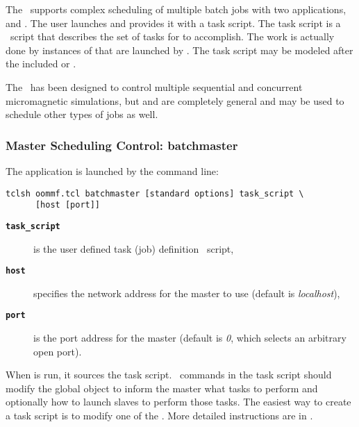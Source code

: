 The \OBS\ supports complex scheduling of multiple batch jobs
with two applications,  and .
The user launches  and provides it with
a task script.  The task script is a
\Tcl\ script that describes the set of tasks for 
to accomplish.  The work is actually done by instances of
 that are launched by .
The task script may be
modeled after the included {} or {}
.

The \OBS\ has been designed to control multiple sequential and
concurrent micromagnetic simulations, but
 and  are completely general
and may be used to schedule other types of jobs as well.

\subsubsection{Master Scheduling Control: batchmaster}\par
The application  is
launched by the command line:
\begin{verbatim}
tclsh oommf.tcl batchmaster [standard options] task_script \
      [host [port]]
\end{verbatim}
\begin{description}
\item[{\tt\bf task\_script}]
  is the user defined task (job) definition \Tcl\ script,
\item[{\tt\bf host}]
  specifies the network address for the master to use (default is {\em
  localhost}),
\item[{\tt\bf port}]
  is the port address for the master (default is {\em 0}, which
  selects an arbitrary open port).
\end{description}

When  is run, it
sources the task script.  \Tcl\ commands in the task script
should modify the global object 
to inform the master what tasks to perform and
optionally how to launch slaves to perform those tasks.
The easiest way to create a task script is to modify one of the
.  More detailed instructions are in
.

